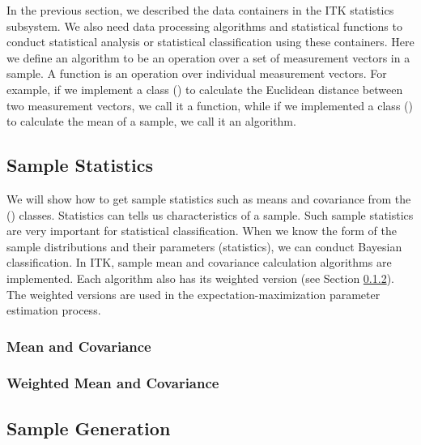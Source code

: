 In the previous section, we described the data containers in the ITK
statistics subsystem. We also need data processing algorithms and statistical
functions to conduct statistical analysis or statistical classification using
these containers. Here we define an algorithm to be an operation over a set
of measurement vectors in a sample. A function is an operation over
individual measurement vectors. For example, if we implement a class
() to calculate the Euclidean
distance between two measurement vectors, we call it a function, while if we
implemented a class () to calculate
the mean of a sample, we call it an algorithm.

\subsection{Sample Statistics}
\label{sec:SampleStatistics}

We will show how to get sample statistics such as means and covariance from
the () classes. Statistics can tells us
characteristics of a sample. Such sample statistics are very important for
statistical classification. When we know the form of the sample distributions
and their parameters (statistics), we can conduct Bayesian classification. In
ITK, sample mean and covariance calculation algorithms are implemented. Each
algorithm also has its weighted version (see Section
\ref{sec:WeightedMeanCovariance}). The weighted versions are used in the
expectation-maximization parameter estimation process.

\subsubsection{Mean and Covariance}
\label{sec:MeanCovariance}



\subsubsection{Weighted Mean and Covariance}
\label{sec:WeightedMeanCovariance}



\subsection{Sample Generation}
\label{sec:SampleGeneration}

